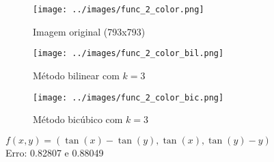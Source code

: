 \documentclass[leqno]{article}
\begin{document}
\begin{figure}[H]
    \centering
    \begin{subfigure}{.33\textwidth}
      \centering
      \texttt{[image: ../images/func\_2\_color.png]}
      \caption{Imagem original  (793x793) }
      \label{fig:sub1}
    \end{subfigure}%
    \begin{subfigure}{.33\textwidth}
      \centering
      \texttt{[image: ../images/func\_2\_color\_bil.png]}
      \caption{Método bilinear com $k = 3$}
      \label{fig:sub2}
    \end{subfigure}
    \begin{subfigure}{.33\textwidth}
        \centering
        \texttt{[image: ../images/func\_2\_color\_bic.png]}
        \caption{Método bicúbico com $k = 3$}
        \label{fig:sub1}
      \end{subfigure}%
    \caption{$f(x,y) = (\tan(x) - \tan(y), \tan(x), \tan(y) - y)$ \\ Erro: 0.82807 e 0.88049}
    \label{fig:test}
\end{figure}
\end{document}
